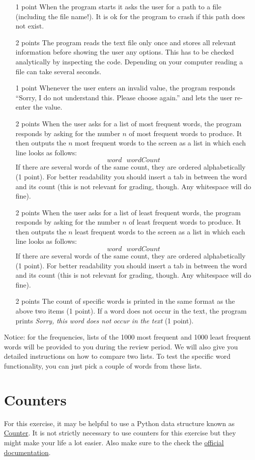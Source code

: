 \documentclass[11pt, leqno, a4paper]{article}
\begin{document}
\begin{itemize}
\item[1 point] When the program starts it asks the user for a path to a file (including the file name!). It is ok for the program to crash if this path does not exist.
\item[2 points] The program reads the text file only once and stores all relevant information before showing the user any options. This has to
be checked analytically by inspecting the code. Depending on your computer reading a file can take several seconds.
\item[1 point] Whenever the user enters an invalid value, the program responds ``Sorry, I do not understand this. Please choose again.'' and lets the
user re-enter the value.
\item[2 points] When the user asks for a list of most frequent words, the program responds by asking for the number $ n $ of most frequent words to 
produce. It then outputs the $ n $ most frequent words to the screen as a list in which each line looks as follows:
$$ word~~~wordCount $$
If there are several words of the same count, they are ordered alphabetically (1 point). For better readability
you should insert a tab in between the word and its count (this is not relevant for grading, though. Any whitespace will do fine).
\item[2 points] When the user asks for a list of least frequent words, the program responds by asking for the number $ n $ of least frequent words to 
produce. It then outputs the $ n $ least frequent words to the screen as a list in which each line looks as follows:
$$ word~~~wordCount $$
If there are several words of the same count, they are ordered alphabetically (1 point).  For better readability
you should insert a tab in between the word and its count (this is not relevant for grading, though. Any whitespace will do fine).
\item[2 points] The count of specific words is printed in the same format as the above two items (1 point). If a word does not occur in the text, the program prints \textit{Sorry, this
word does not occur in the text} (1 point).
\end{itemize}

Notice: for the frequencies, lists of the 1000 most frequent and 1000 least frequent words will be provided to you during the review period. We will also give
you detailed instructions on how to compare two lists. To test the specific word functionality, you can just pick a couple of words from these lists.

\enlargethispage{1cm}
\section{Counters}
For this exercise, it may be helpful to use a Python data structure known as 
\href{https://pymotw.com/3/collections/counter.html}{Counter}. It is not strictly necessary to use counters
for this exercise but they might make your life a lot easier. Also make sure to the check the
\href{https://docs.python.org/3/library/collections.html#collections.Counter}{official documentation}.
\end{document}
